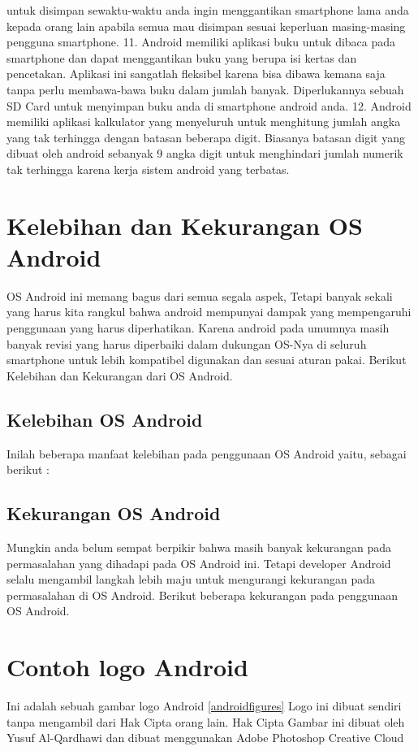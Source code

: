 			untuk disimpan sewaktu-waktu anda ingin menggantikan smartphone lama anda kepada orang lain apabila semua mau disimpan sesuai keperluan masing-masing pengguna smartphone.
		11.	Android memiliki aplikasi buku untuk dibaca pada smartphone dan dapat menggantikan buku yang berupa isi kertas dan pencetakan. Aplikasi ini sangatlah fleksibel karena bisa dibawa kemana saja tanpa perlu membawa-bawa
			buku dalam jumlah banyak. Diperlukannya sebuah SD Card untuk menyimpan buku anda di smartphone android anda.
		12.	Android memiliki aplikasi kalkulator yang menyeluruh untuk menghitung jumlah angka yang tak terhingga dengan batasan beberapa digit. Biasanya batasan digit yang dibuat oleh android sebanyak 9 angka digit
			untuk menghindari jumlah numerik tak terhingga karena kerja sistem android yang terbatas.
	\cite{anwar2014implementasi}
	\section{Kelebihan dan Kekurangan OS Android}
		OS Android ini memang bagus dari semua segala aspek, Tetapi banyak sekali yang harus kita rangkul bahwa android mempunyai dampak yang mempengaruhi penggunaan yang harus diperhatikan. Karena android pada umumnya masih banyak revisi
		yang harus diperbaiki dalam dukungan OS-Nya di seluruh smartphone untuk lebih kompatibel digunakan dan sesuai aturan pakai. Berikut Kelebihan dan Kekurangan dari OS Android.
	
	\subsection{Kelebihan OS Android}
		Inilah beberapa manfaat kelebihan pada penggunaan OS Android yaitu, sebagai berikut :
		\cite{hamka2013aplikasi}
		
	\subsection{Kekurangan OS Android}
		Mungkin anda belum sempat berpikir bahwa masih banyak kekurangan pada permasalahan yang dihadapi pada OS Android ini. Tetapi developer Android selalu mengambil langkah lebih maju untuk mengurangi
		kekurangan pada permasalahan di OS Android. Berikut beberapa kekurangan pada penggunaan OS Android.
		\cite{hamka2013aplikasi}
	
	\section{Contoh logo Android}
		Ini adalah sebuah gambar logo Android \ref{androidfigures}
		Logo ini dibuat sendiri tanpa mengambil dari Hak Cipta orang lain.
		Hak Cipta Gambar ini dibuat oleh Yusuf Al-Qardhawi dan dibuat menggunakan Adobe Photoshop Creative Cloud
		
